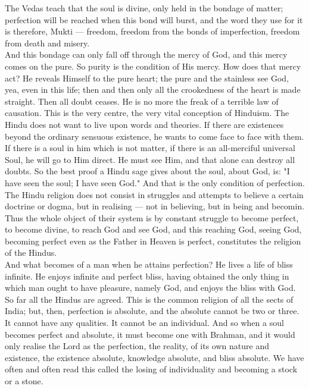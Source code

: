 The Vedas teach that the soul is divine, only held in the
bondage of matter;
perfection will be reached when this bond will burst, and the word they
use for it is
therefore, Mukti — freedom, freedom from the bonds of imperfection,
freedom from
death and misery.\\

And this bondage can only fall off through the mercy of God,
and this mercy comes on
the pure. So purity is the condition of His mercy. How does that mercy
act? He reveals
Himself to the pure heart; the pure and the stainless see God, yea,
even in this life;
then and then only all the crookedness of the heart is made straight.
Then all doubt
ceases. He is no more the freak of a terrible law of causation. This is
the very
centre, the very vital conception of Hinduism. The Hindu does not want
to live upon
words and theories. If there are existences beyond the ordinary
sensuous existence, he
wants to come face to face with them. If there is a soul in him which
is not matter,
if there is an all-merciful universal Soul, he will go to Him direct.
He must see Him,
and that alone can destroy all doubts. So the best proof a Hindu sage
gives about the
soul, about God, is: "I have seen the soul; I have seen God." And that
is
the only condition of perfection. The Hindu religion does not consist
in struggles and
attempts to believe a certain doctrine or dogma, but in realising — not
in
believing, but in being and becomin.\\

Thus the whole object of their system is by constant struggle
to become perfect, to become divine, to reach God and see God, and this
reaching God, seeing God, becoming perfect even as the Father in Heaven
is perfect, constitutes the religion of the Hindus.\\

And what becomes of a man when he attains perfection? He lives
a life of bliss
infinite. He enjoys infinite and perfect bliss, having obtained the
only thing in
which man ought to have pleasure, namely God, and enjoys the bliss with
God.
So far all the Hindus are agreed. This is the common religion of all
the sects of India; but, then, perfection is absolute, and the absolute
cannot be two or three. It cannot have any qualities. It cannot be an
individual. And so when a soul becomes perfect and absolute, it
must become one with Brahman, and
it would only realise the Lord as the perfection,
the reality, of its own nature and existence, the existence absolute,
knowledge
absolute, and bliss absolute. We have often and often read this called
the losing
of individuality and becoming a stock or a stone.\\

